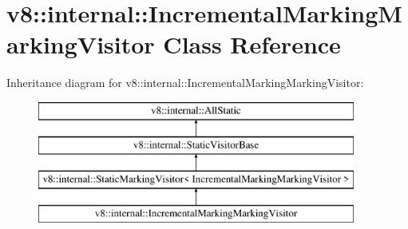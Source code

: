 \hypertarget{classv8_1_1internal_1_1_incremental_marking_marking_visitor}{}\section{v8\+:\+:internal\+:\+:Incremental\+Marking\+Marking\+Visitor Class Reference}
\label{classv8_1_1internal_1_1_incremental_marking_marking_visitor}
Inheritance diagram for v8\+:\+:internal\+:\+:Incremental\+Marking\+Marking\+Visitor\+:\begin{figure}[H]
\begin{center}
\leavevmode
\includegraphics[height=4.000000cm]{classv8_1_1internal_1_1_incremental_marking_marking_visitor}
\end{center}
\end{figure}
